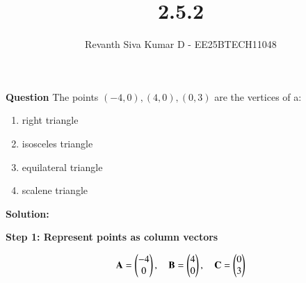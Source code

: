 \documentclass[journal]{IEEEtran}
\begin{document}


\title{2.5.2}
\author{Revanth Siva Kumar D - EE25BTECH11048
}
{\let\newpage\relax\maketitle}

\textbf{Question} 
The points $(-4,0), (4,0), (0,3)$ are the vertices of a:
\begin{enumerate}[label=(\alph*)]
    \item right triangle
    \item isosceles triangle
    \item equilateral triangle
    \item scalene triangle
\end{enumerate}

\textbf{Solution:} 

\textbf{Step 1: Represent points as column vectors}


\begin{align}
\mathbf{A} = \begin{pmatrix}-4\\0\end{pmatrix}, \quad 
\mathbf{B} = \begin{pmatrix}4\\0\end{pmatrix}, \quad 
\mathbf{C} = \begin{pmatrix}0\\3\end{pmatrix}
\end{align}
\end{document}
